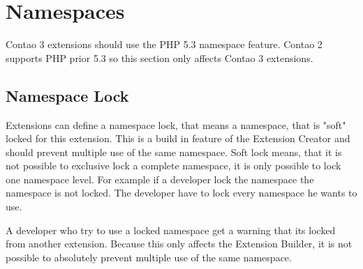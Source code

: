 \section[sec:namespaces]{Namespaces}

Contao 3 extensions should use the PHP 5.3 namespace feature. Contao 2 supports PHP prior 5.3 so this section only affects Contao 3 extensions.

\subsection[sec:namespace lock]{Namespace Lock}

Extensions can define a namespace lock, that means a namespace, that is "soft" locked for this extension.
This is a build in feature of the Extension Creator and should prevent multiple use of the same namespace.
Soft lock means, that it is not possible to exclusive lock a complete namespace, it is only possible to lock one namespace level.
For example if a developer lock the namespace  the namespace  is not locked.
The developer have to lock every namespace he wants to use.

A developer who try to use a locked namespace get a warning that its locked from another extension.
Because this only affects the Extension Builder, it is not possible to absolutely prevent multiple use of the same namespace.
